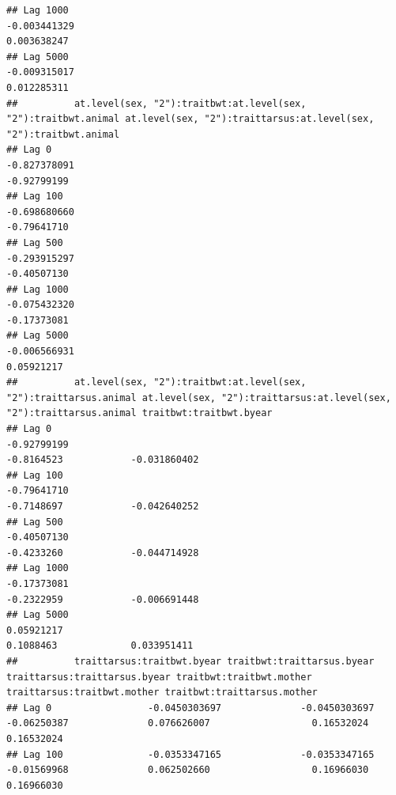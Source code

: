 \documentclass[
  12pt,
]{book}
\begin{document}
\begin{verbatim}
## Lag 1000                                                      -0.003441329                                                          0.003638247
## Lag 5000                                                      -0.009315017                                                          0.012285311
##          at.level(sex, "2"):traitbwt:at.level(sex, "2"):traitbwt.animal at.level(sex, "2"):traittarsus:at.level(sex, "2"):traitbwt.animal
## Lag 0                                                      -0.827378091                                                       -0.92799199
## Lag 100                                                    -0.698680660                                                       -0.79641710
## Lag 500                                                    -0.293915297                                                       -0.40507130
## Lag 1000                                                   -0.075432320                                                       -0.17373081
## Lag 5000                                                   -0.006566931                                                        0.05921217
##          at.level(sex, "2"):traitbwt:at.level(sex, "2"):traittarsus.animal at.level(sex, "2"):traittarsus:at.level(sex, "2"):traittarsus.animal traitbwt:traitbwt.byear
## Lag 0                                                          -0.92799199                                                           -0.8164523            -0.031860402
## Lag 100                                                        -0.79641710                                                           -0.7148697            -0.042640252
## Lag 500                                                        -0.40507130                                                           -0.4233260            -0.044714928
## Lag 1000                                                       -0.17373081                                                           -0.2322959            -0.006691448
## Lag 5000                                                        0.05921217                                                            0.1088463             0.033951411
##          traittarsus:traitbwt.byear traitbwt:traittarsus.byear traittarsus:traittarsus.byear traitbwt:traitbwt.mother traittarsus:traitbwt.mother traitbwt:traittarsus.mother
## Lag 0                 -0.0450303697              -0.0450303697                   -0.06250387              0.076626007                  0.16532024                  0.16532024
## Lag 100               -0.0353347165              -0.0353347165                   -0.01569968              0.062502660                  0.16966030                  0.16966030

\end{verbatim}
\end{document}

